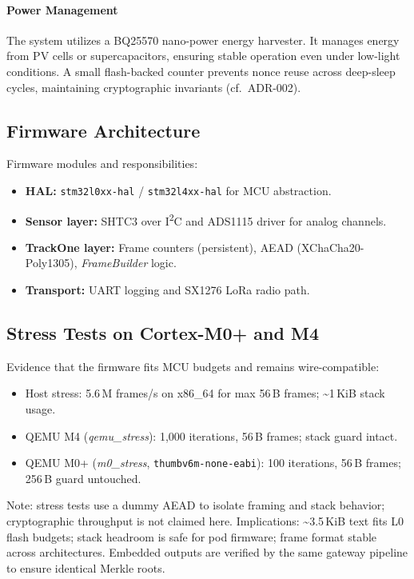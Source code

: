 \paragraph{Power Management}
The system utilizes a BQ25570 nano-power energy harvester.
It manages energy from PV cells or supercapacitors, ensuring stable operation even under low-light conditions.
A small flash-backed counter prevents nonce reuse across deep-sleep cycles, maintaining cryptographic invariants (cf.~\ac{ADR}-002).

\subsection{Firmware Architecture}\label{subsec:firmware-architecture}
Firmware modules and responsibilities:
\begin{itemize}[nosep]
  \item \textbf{HAL:} \texttt{stm32l0xx-hal} / \texttt{stm32l4xx-hal} for \ac{MCU} abstraction.
  \item \textbf{Sensor layer:} SHTC3 over I\textsuperscript{2}C and ADS1115 driver for analog channels.
  \item \textbf{TrackOne layer:} Frame counters (persistent), \ac{AEAD} (XChaCha20-Poly1305), \emph{FrameBuilder} logic.
  \item \textbf{Transport:} UART logging and SX1276 \ac{LoRa} radio path.
\end{itemize}

\subsection{Stress Tests on Cortex-M0+ and M4}\label{subsec:stress-tests-on-cortex-m0+-and-m4}
Evidence that the firmware fits \ac{MCU} budgets and remains wire-compatible:
\begin{itemize}[nosep]
  \item Host stress: 5.6\,M frames/s on x86\_64 for max 56\,B frames; \textasciitilde1\,KiB stack usage.
  \item QEMU M4 (\emph{qemu\_stress}): 1{,}000 iterations, 56\,B frames; stack guard intact.
  \item QEMU M0+ (\emph{m0\_stress}, \texttt{thumbv6m-none-eabi}): 100 iterations, 56\,B frames; 256\,B guard untouched.
\end{itemize}
Note: stress tests use a dummy \ac{AEAD} to isolate framing and stack behavior; cryptographic throughput is not claimed here.
Implications: \textasciitilde3.5\,KiB text fits L0 flash budgets; stack headroom is safe for pod firmware; frame format stable across architectures.
Embedded outputs are verified by the same gateway pipeline to ensure identical Merkle roots.

